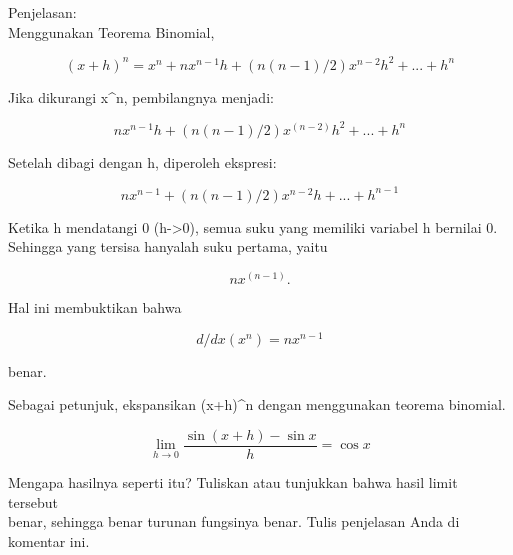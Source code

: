 \documentclass[a4paper,10pt]{article}
\begin{document}
\begin{eulernotebook}
\begin{eulercomment}
\begin{eulercomment}
\begin{eulercomment}
\begin{eulercomment}
\begin{eulercomment}
Penjelasan:\\
Menggunakan Teorema Binomial,\\
\end{eulercomment}
\begin{eulerformula}
\[
(x+h)^n = x^n + nx^{n-1}h + (n(n-1)/2)x^{n-2}h^2 + ... + h^n
\]
\end{eulerformula}
\begin{eulercomment}
Jika dikurangi x\textasciicircum{}n, pembilangnya menjadi:\\
\end{eulercomment}
\begin{eulerformula}
\[
nx^{n-1}h + (n(n-1)/2)x^(n-2)h^2 + ... + h^n
\]
\end{eulerformula}
\begin{eulercomment}
Setelah dibagi dengan h, diperoleh ekspresi:\\
\end{eulercomment}
\begin{eulerformula}
\[
nx^{n-1} + (n(n-1)/2)x^{n-2}h + ... + h^{n-1}
\]
\end{eulerformula}
\begin{eulercomment}
Ketika h mendatangi 0 (h-\textgreater{}0), semua suku yang memiliki variabel h
bernilai 0.\\
Sehingga yang tersisa hanyalah suku pertama, yaitu\\
\end{eulercomment}
\begin{eulerformula}
\[
nx^(n-1).
\]
\end{eulerformula}
\begin{eulercomment}
Hal ini membuktikan bahwa\\
\end{eulercomment}
\begin{eulerformula}
\[
d/dx (x^n) = nx^{n-1}
\]
\end{eulerformula}
\begin{eulercomment}
benar.


Sebagai petunjuk, ekspansikan (x+h)\textasciicircum{}n dengan menggunakan teorema
binomial.
\end{eulercomment}
\begin{eulerformula}
\[
\lim_{h\rightarrow 0}{\frac{\sin \left(x+h\right)-\sin x}{h}}=\cos   x
\]
\end{eulerformula}
\begin{eulercomment}
Mengapa hasilnya seperti itu? Tuliskan atau tunjukkan bahwa hasil
limit tersebut\\
benar, sehingga benar turunan fungsinya benar.  Tulis penjelasan Anda
di komentar ini.



\end{eulercomment}
\end{eulercomment}
\end{eulercomment}
\end{eulercomment}
\end{eulercomment}
\end{eulernotebook}
\end{document}
